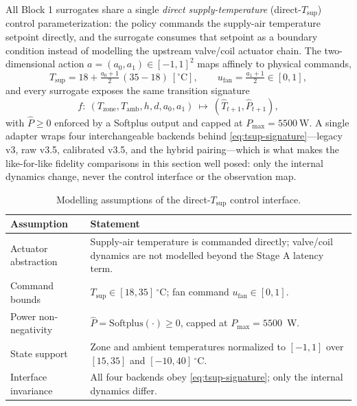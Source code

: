 \documentclass[11pt,a4paper]{article}
\newcommand{\Tsupply}{\ensuremath{T_{\mathrm{sup}}}}
\newcommand{\That}{\ensuremath{\widehat{T}}}
\begin{document}
All Block 1 surrogates share a single \emph{direct supply-temperature} (direct-\Tsupply{}) control parameterization: the policy commands the supply-air temperature setpoint directly, and the surrogate consumes that setpoint as a boundary condition instead of modelling the upstream valve/coil actuator chain. The two-dimensional action \(a=(a_0,a_1)\in[-1,1]^2\) maps affinely to physical commands,
\begin{equation}
  \Tsupply = 18 + \tfrac{a_0+1}{2}\,(35-18)~[^\circ\mathrm{C}],
  \qquad
  u_{\mathrm{fan}} = \tfrac{a_1+1}{2}\in[0,1],
  \label{eq:action-map}
\end{equation}
and every surrogate exposes the same transition signature
\begin{equation}
  f:\ (T_{\mathrm{zone}},T_{\mathrm{amb}},h,d,a_0,a_1)\ \longmapsto\ (\That_{t+1},\widehat{P}_{t+1}),
  \label{eq:tsup-signature}
\end{equation}
with \(\widehat{P}\ge 0\) enforced by a Softplus output and capped at \(P_{\max}=5500~\mathrm{W}\). A single adapter wraps four interchangeable backends behind \eqref{eq:tsup-signature}---legacy v3, raw v3.5, calibrated v3.5, and the hybrid pairing---which is what makes the like-for-like fidelity comparisons in this section well posed: only the internal dynamics change, never the control interface or the observation map.

\begin{table}[H]
\centering
\small
\caption{Modelling assumptions of the direct-\Tsupply{} control interface.}
\label{tab:tsup-assumptions}
\begin{tabularx}{\linewidth}{lX}
\toprule
Assumption & Statement \\
\midrule
Actuator abstraction & Supply-air temperature is commanded directly; valve/coil dynamics are not modelled beyond the Stage A latency term. \\
Command bounds & \(\Tsupply\in[18,35]\,^\circ\)C; fan command \(u_{\mathrm{fan}}\in[0,1]\). \\
Power non-negativity & \(\widehat{P}=\mathrm{Softplus}(\cdot)\ge 0\), capped at \(P_{\max}=5500\)~W. \\
State support & Zone and ambient temperatures normalized to \([-1,1]\) over \([15,35]\) and \([-10,40]\,^\circ\)C. \\
Interface invariance & All four backends obey \eqref{eq:tsup-signature}; only the internal dynamics differ. \\
\bottomrule
\end{tabularx}
\end{table}
\end{document}
